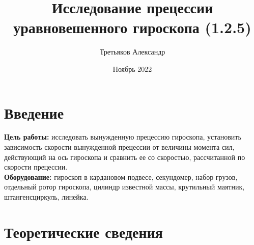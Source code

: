 \documentclass[a4paper,12pt]{article}
\title{\textbf{Исследование прецессии уравновешенного гироскопа (1.2.5)}}
\author{Третьяков Александр}
\date{Ноябрь 2022}
\begin{document}
	
	\maketitle
	
	\section{Введение}
	
	\textbf{Цель работы:} исследовать вынужденную прецессию гироскопа, установить зависимость скорости вынужденной прецессии от величины момента сил, действующий на ось гироскопа и сравнить ее со скоростью, рассчитанной по скорости прецессии.\\
	\textbf{Оборудование:} гироскоп в кардановом подвесе, секундомер, набор грузов, отдельный ротор гироскопа, цилиндр известной массы, крутильный маятник, штангенсциркуль, линейка.
	
	\section{Теоретические сведения}
	
\end{document}
